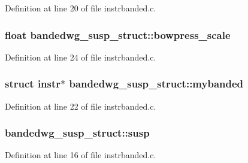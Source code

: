 Definition at line 20 of file instrbanded.\+c.

\subsubsection[{\texorpdfstring{bowpress\+\_\+scale}{bowpress_scale}}]{\setlength{\rightskip}{0pt plus 5cm}float bandedwg\+\_\+susp\+\_\+struct\+::bowpress\+\_\+scale}\hypertarget{structbandedwg__susp__struct_a3d7289bacdaad65fff599d14c8ea2eb9}{}\label{structbandedwg__susp__struct_a3d7289bacdaad65fff599d14c8ea2eb9}


Definition at line 24 of file instrbanded.\+c.

\subsubsection[{\texorpdfstring{mybanded}{mybanded}}]{\setlength{\rightskip}{0pt plus 5cm}struct {\bf instr}$\ast$ bandedwg\+\_\+susp\+\_\+struct\+::mybanded}\hypertarget{structbandedwg__susp__struct_ac642b5c2c0b8d64f10f712c720cc5293}{}\label{structbandedwg__susp__struct_ac642b5c2c0b8d64f10f712c720cc5293}


Definition at line 22 of file instrbanded.\+c.

\subsubsection[{\texorpdfstring{susp}{susp}}]{ bandedwg\+\_\+susp\+\_\+struct\+::susp}\hypertarget{structbandedwg__susp__struct_a896df620d872d23682bc90192a0bca48}{}\label{structbandedwg__susp__struct_a896df620d872d23682bc90192a0bca48}


Definition at line 16 of file instrbanded.\+c.

